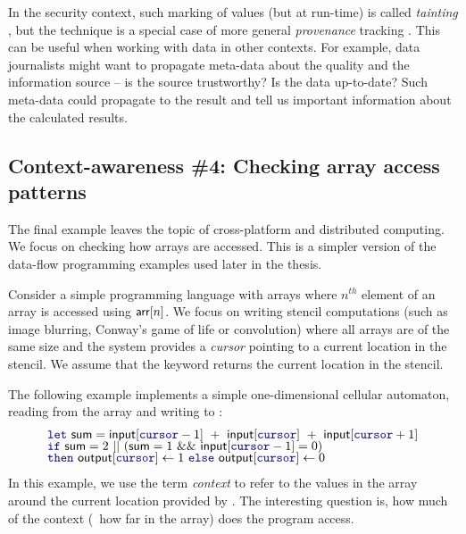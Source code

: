 In the security context, such marking of values (but at run-time) is called \emph{tainting} 
\cite{app-tainting-sql}, but the technique is a special case of more general \emph{provenance}
tracking \cite{app-provenance-future}. This can be useful when working with data in other contexts. 
For example, data journalists might want to propagate meta-data about the quality and the 
information source -- is the source trustworthy? Is the data up-to-date? Such meta-data could 
propagate to the result and tell us important information about the calculated results.


\subsection{Context-awareness \#4: Checking array access patterns}
\label{sec:intro-why-array}

The final example leaves the topic of cross-platform and distributed computing. We focus on
checking how arrays are accessed. This is a simpler version of the data-flow programming
examples used later in the thesis.

Consider a simple programming language with arrays where $n^{\mathit{th}}$ element of an
array  is accessed using $\textnormal{\sffamily arr}[n]$. We focus on writing stencil computations
(such as image blurring, Conway's game of life or convolution) where all arrays are of
the same size and the system provides a \emph{cursor} pointing to a current location in the 
stencil. We assume that the keyword  returns the current location in the stencil.

The following example implements a simple one-dimensional cellular automaton, reading from the
 array and writing to :
%
\begin{equation*}
\begin{array}{l}
\kvd{let}~\ident{sum}=\ident{input}[\kvd{cursor} - 1] ~+~ \ident{input}[\kvd{cursor}] ~+~ \ident{input}[\kvd{cursor} + 1]\\[-0.25em]
\kvd{if}~\ident{sum}=2 ~||~ (\ident{sum}=1 ~\&\&~ \ident{input}[\kvd{cursor} - 1] = 0)\\[-0.25em]
\kvd{then}~\ident{output}[\kvd{cursor}] \leftarrow 1 ~\kvd{else}~\ident{output}[\kvd{cursor}] \leftarrow 0
\end{array}
\end{equation*}
%
In this example, we use the term \emph{context} to refer to the values in the array around the
current location provided by . The interesting question is, how much of the context
(\ie~how far in the array) does the program access.

